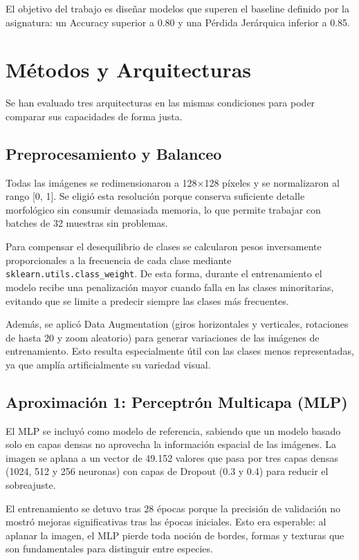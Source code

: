 \documentclass[conference]{IEEEtran}
\begin{document}
El objetivo del trabajo es diseñar modelos que superen el baseline definido por la asignatura: un Accuracy superior a 0.80 y una Pérdida Jerárquica inferior a 0.85.

\section{Métodos y Arquitecturas}
Se han evaluado tres arquitecturas en las mismas condiciones para poder comparar sus capacidades de forma justa.

\subsection{Preprocesamiento y Balanceo}
Todas las imágenes se redimensionaron a 128$\times$128 píxeles y se normalizaron al rango [0, 1]. Se eligió esta resolución porque conserva suficiente detalle morfológico sin consumir demasiada memoria, lo que permite trabajar con batches de 32 muestras sin problemas.

Para compensar el desequilibrio de clases se calcularon pesos inversamente proporcionales a la frecuencia de cada clase mediante \texttt{sklearn.utils.class\_weight}. De esta forma, durante el entrenamiento el modelo recibe una penalización mayor cuando falla en las clases minoritarias, evitando que se limite a predecir siempre las clases más frecuentes.

Además, se aplicó Data Augmentation (giros horizontales y verticales, rotaciones de hasta 20\degree{} y zoom aleatorio) para generar variaciones de las imágenes de entrenamiento. Esto resulta especialmente útil con las clases menos representadas, ya que amplía artificialmente su variedad visual.

\subsection{Aproximación 1: Perceptrón Multicapa (MLP)}
El MLP se incluyó como modelo de referencia, sabiendo que un modelo basado solo en capas densas no aprovecha la información espacial de las imágenes. La imagen se aplana a un vector de 49.152 valores que pasa por tres capas densas (1024, 512 y 256 neuronas) con capas de Dropout (0.3 y 0.4) para reducir el sobreajuste.

El entrenamiento se detuvo tras 28 épocas porque la precisión de validación no mostró mejoras significativas tras las épocas iniciales. Esto era esperable: al aplanar la imagen, el MLP pierde toda noción de bordes, formas y texturas que son fundamentales para distinguir entre especies.
\end{document}
